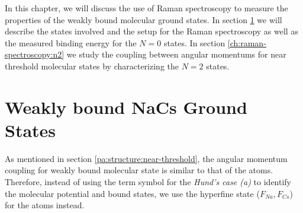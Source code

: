 In this chapter, we will discuss the use of Raman spectroscopy
to measure the properties of the weakly bound molecular ground states.
In section \ref{ch:raman-spectroscopy:states}
we will describe the states involved and the setup for the Raman spectroscopy
as well as the measured binding energy for the $N=0$ states.
In section \ref{ch:raman-spectroscopy:n2}
we study the coupling between angular momentums for near threshold molecular states
by characterizing the $N=2$ states.

\section{Weakly bound NaCs Ground States}
\label{ch:raman-spectroscopy:states}

As mentioned in section \ref{pa:structure:near-threshold},
the angular momentum coupling for weakly bound molecular state is similar to that of the atoms.
Therefore, instead of using the term symbol for the \textit{Hund's case (a)}
to identify the molecular potential and bound states,
we use the hyperfine state ($F_{Na}, F_{Cs}$) for the atoms instead.

